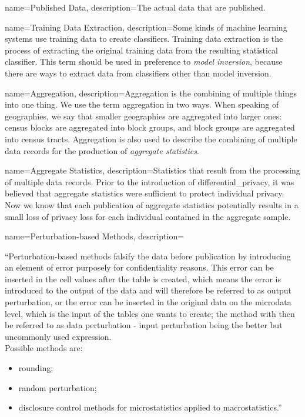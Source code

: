 {
    name=Published Data,
    description={The actual data that are published.}
}

{
    name=Training Data Extraction,
    description={Some kinds of machine learning systems use training data to create classifiers. Training data extraction is the process of extracting the original training data from the resulting statistical classifier. This term should be used in preference to \textit{model inversion}, because there are ways to extract data from classifiers other than model inversion. }
}

{
    name=Aggregation,
    description={Aggregation is the combining of multiple things into one thing. We use the term aggregation in two ways. When speaking of geographies, we say that smaller geographies are aggregated into larger ones: census blocks are aggregated into block groups, and block groups are aggregated into census tracts. Aggregation is also used to describe the combining of multiple data \glspl{record} for the production of \emph{aggregate statistics}.
    }
}

{
    name=Aggregate Statistics,
    description={Statistics that result from the processing of multiple data \glspl{record}. Prior to the introduction of \gls{differential_privacy}, it was believed that aggregate statistics were sufficient to protect individual privacy. Now we know that each publication of aggregate statistics potentially results in a small loss of privacy loss for each individual contained in the aggregate sample.}
}

{
    name=Perturbation-based Methods,
    description={``Perturbation-based methods falsify the data before publication by introducing an element of error purposely for confidentiality reasons. This error can be inserted in the cell values after the table is created, which means the error is introduced to the output of the data and will therefore be referred to as output perturbation, or the error can be inserted in the original data on the microdata level, which is the input of the tables one wants to create; the method with then be referred to as data perturbation - input perturbation being the better but uncommonly used expression.
~\\
Possible methods are:
\begin{itemize}
\item rounding;
      \item random perturbation;
      \item disclosure control methods for microstatistics applied to macrostatistics.''\parencite{oecd_oecd_nodate}
\end{itemize}
    }
}

